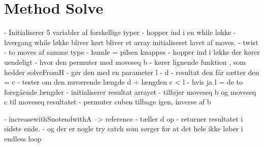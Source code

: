 \section{Method Solve}

- Initialiserer 5 variabler af forskellige typer
- hopper ind i en while løkke
- hvergang while løkke bliver kørt bliver et array initialiseret lavet af moves.
- twist
- to moves af samme type
-  humle = pilsen knappes
- hopper ind i løkke der kører uendeligt
- hvor den permuter med moveseq b
- kører lignende funktion , som hedder solveFromH
- gør den med en parameter l - d
- resultat den får sætter den = c
- tester om den nuværende længde d + længden c < l
- hvis ja l = de to foregående længder
- initialiserer resultat arrayet
- tilføjer moveseq b og moveseq c til moveseq resultatet
- permuter cuben tilbage igen, inverse af b

- increasewithSnotendwithA --> reference
- tæller d op
- returner resultatet i sidste ende.
-  og der er nogle try catch som sørger for at det hele ikke løber i endless loop

